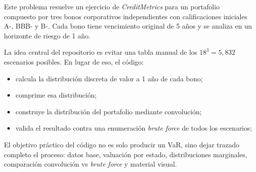 Este problema resuelve un ejercicio de \textit{CreditMetrics} para un portafolio compuesto por tres bonos corporativos independientes con calificaciones iniciales A-, BBB- y B-. Cada bono tiene vencimiento original de 5 a\~nos y se analiza en un horizonte de riesgo de 1 a\~no.

La idea central del repositorio es evitar una tabla manual de los \(18^3 = 5{,}832\) escenarios posibles. En lugar de eso, el c\'odigo:

\begin{itemize}
  \item calcula la distribuci\'on discreta de valor a 1 a\~no de cada bono;
  \item comprime esa distribuci\'on;
  \item construye la distribuci\'on del portafolio mediante convoluci\'on;
  \item valida el resultado contra una enumeraci\'on \textit{brute force} de todos los escenarios;
\end{itemize}

El objetivo pr\'actico del c\'odigo no es solo producir un VaR, sino dejar trazado completo el proceso: datos base, valuaci\'on por estado, distribuciones marginales, comparaci\'on convoluci\'on vs \textit{brute force} y material visual.

